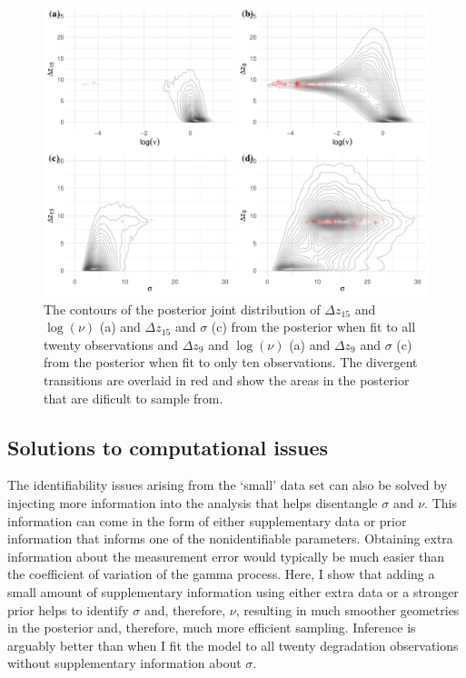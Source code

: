 \begin{figure}
  \centering
  \includegraphics[width=0.95\columnwidth]{./figures/ch-4/joint-sig-jump.pdf}
  \caption{The contours of the posterior joint distribution of $\Delta z_{15}$ and $\log(\nu)$ (a) and $\Delta z_{15}$ and $\sigma$ (c) from the posterior when fit to all twenty observations and $\Delta z_{9}$ and $\log(\nu)$ (a) and $\Delta z_{9}$ and $\sigma$ (c) from the posterior when fit to only ten observations. The divergent transitions are overlaid in red and show the areas in the posterior that are dificult to sample from.}
  \label{fig:z-jump-comparison}
\end{figure}

\subsection{Solutions to computational issues} \label{sec:comp-sols}

The identifiability issues arising from the `small' data set can also be solved by injecting more information into the analysis that helps disentangle $\sigma$ and $\nu$. This information can come in the form of either supplementary data or prior information that informs one of the nonidentifiable parameters. Obtaining extra information about the measurement error would typically be much easier than the coefficient of variation of the gamma process. Here, I show that adding a small amount of supplementary information using either extra data or a stronger prior helps to identify $\sigma$ and, therefore, $\nu$, resulting in much smoother geometries in the posterior and, therefore, much more efficient sampling. Inference is arguably better than when I fit the model to all twenty degradation observations without supplementary information about $\sigma$.

